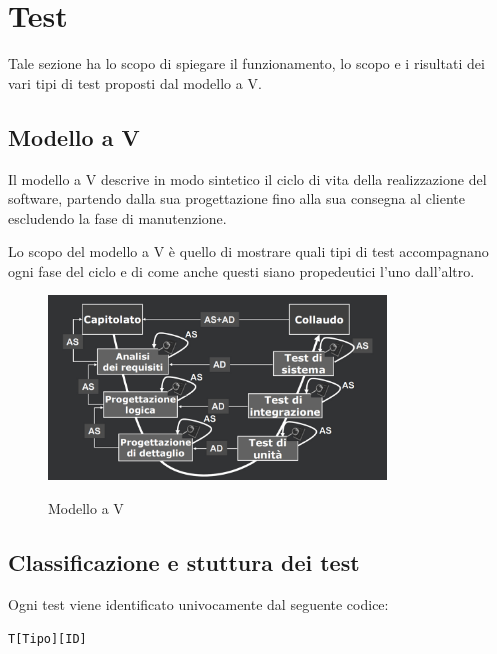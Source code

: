 \section{Test} \label{test}

Tale sezione ha lo scopo di spiegare il funzionamento, lo scopo e i risultati dei vari tipi di test proposti dal modello a V.

\subsection{Modello a V} \label{sezionemodelloV}
Il modello a V descrive in modo sintetico il ciclo di vita della realizzazione del software, partendo dalla sua progettazione fino alla sua consegna al cliente escludendo la fase di manutenzione.

Lo scopo del modello a V è quello di mostrare quali tipi di test accompagnano ogni fase del ciclo e di come anche questi siano propedeutici l'uno dall'altro.

\begin{figure}[H]
	\centering
	\includegraphics[width=0.8\textwidth]{img/modellov-sweki.jpg}
	\label{img:vmodel}
	\caption{Modello a V\protect\footnotemark}
\end{figure}




\subsection{Classificazione e stuttura dei test} \label{classificazionetest}
Ogni test viene identificato univocamente dal seguente codice:

\begin{center}
	\texttt{T[Tipo][ID]}
\end{center}

